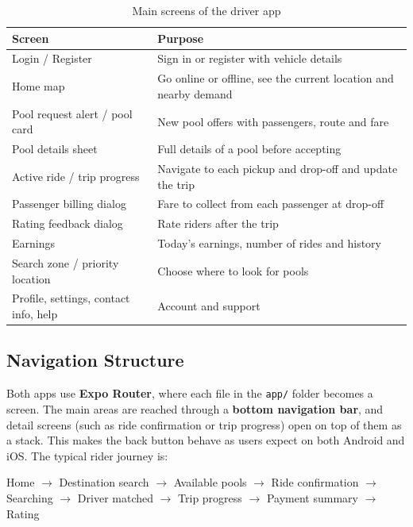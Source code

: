 \begin{table}[H]
  \centering
  \small
  \caption{Main screens of the driver app}
  \label{tab:driver-screens}
  \begin{tabularx}{\textwidth}{@{}p{5.2cm}L@{}}
    \toprule
    \textbf{Screen} & \textbf{Purpose} \\
    \midrule
    Login / Register & Sign in or register with vehicle details \\
    Home map & Go online or offline, see the current location and nearby demand \\
    Pool request alert / pool card & New pool offers with passengers, route and fare \\
    Pool details sheet & Full details of a pool before accepting \\
    Active ride / trip progress & Navigate to each pickup and drop-off and update the trip \\
    Passenger billing dialog & Fare to collect from each passenger at drop-off \\
    Rating feedback dialog & Rate riders after the trip \\
    Earnings & Today's earnings, number of rides and history \\
    Search zone / priority location & Choose where to look for pools \\
    Profile, settings, contact info, help & Account and support \\
    \bottomrule
  \end{tabularx}
\end{table}

\subsection{Navigation Structure}

Both apps use \textbf{Expo Router}, where each file in the \texttt{app/} folder
becomes a screen. The main areas are reached through a \textbf{bottom
navigation bar}, and detail screens (such as ride confirmation or trip progress)
open on top of them as a stack. This makes the back button behave as users
expect on both Android and iOS. The typical rider journey is:

\begin{center}
  \small
  Home $\rightarrow$ Destination search $\rightarrow$ Available pools
  $\rightarrow$ Ride confirmation $\rightarrow$ Searching $\rightarrow$ Driver
  matched $\rightarrow$ Trip progress $\rightarrow$ Payment summary
  $\rightarrow$ Rating
\end{center}

